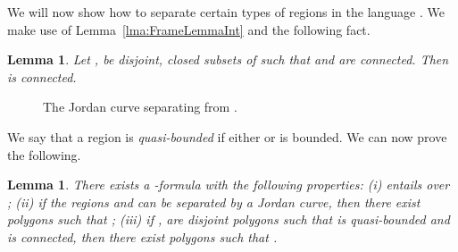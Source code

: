\documentclass{article}
\newtheorem{lemma}[theorem]{Lemma}
\begin{document}
We will now show how to separate certain types of regions in the language . 
We make use of Lemma~\ref{lma:FrameLemmaInt} and the following fact.
\begin{lemma}\label{lma:Newman}{\cite[p.~137]{ijcai:Newman64}}
	Let ,  be disjoint, closed subsets of  such that
	 and  are connected. Then
	 is connected.
\end{lemma}
\begin{figure}[h]
	\begin{center}
	\end{center}
	\caption{The Jordan curve  separating  from .}
	\label{fig:SepBci}
\end{figure}
We say that a region  is \emph{quasi-bounded} if either  or  is bounded.
We can now prove the following.
\begin{lemma}\label{lma:Cci2BciStar}
	There exists a -formula  with the
	following properties: \textup{(}i\textup{)} 
	entails  over ; \textup{(}ii\textup{)}
	if the regions  and  can be separated by a Jordan curve, 
	then there exist polygons  such that 
	; \textup{(}iii\textup{)} if ,
	 are disjoint polygons such that  is quasi-bounded and
	 is connected, then there exist polygons
	 such that .
\end{lemma}
\end{document}
